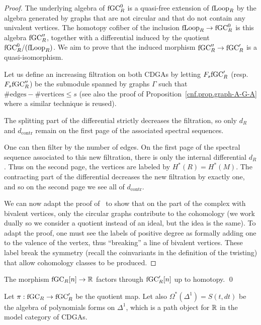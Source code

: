 \begin{proof}
  The underlying algebra of $\mathrm{fGC}^{0}_{R}$ is a quasi-free extension of $\mathrm{fLoop}_{R}$ by the algebra generated by graphs that are not circular and that do not contain any univalent vertices.
  The homotopy cofiber of the inclusion $\mathrm{fLoop}_{R} \to \mathrm{fGC}^{0}_{R}$ is this algebra $\mathrm{fGC}''_{R}$, together with a differential induced by the quotient $\mathrm{fGC}^{0}_{R} / (\mathrm{fLoop}_{R})$.
  We aim to prove that the induced morphism $\mathrm{fGC}''_{R} \to \mathrm{fGC}'_{R}$ is a quasi-iso\-mor\-phism.

  Let us define an increasing filtration on both CDGAs by letting $F_{s}\mathrm{fGC}'_{R}$ (resp.\ $F_{s}\mathrm{fGC}''_{R}$) be the submodule spanned by graphs $\Gamma$ such that $\# \text{edges} - \# \text{vertices} \leq s$ (see also the proof of Proposition~\ref{cnf.prop.graph-A-G-A} where a similar technique is reused).

  The splitting part of the differential strictly decreases the filtration, so only $d_{R}$ and $d_{\mathrm{contr}}$ remain on the first page of the associated spectral sequences.

  One can then filter by the number of edges.
  On the first page of the spectral sequence associated to this new filtration, there is only the internal differential $d_{R}$.
  Thus on the second page, the vertices are labeled by $H^{*}(R) = H^{*}(M)$. The contracting part of the differential decreases the new filtration by exactly one, and so on the second page we see all of $d_{\mathrm{contr}}$.

  We can now adapt the proof of~\cite[Proposition 3.4]{Willwacher2014} to show that on the part of the complex with bivalent vertices, only the circular graphs contribute to the cohomology (we work dually so we consider a quotient instead of an ideal, but the idea is the same).
  To adapt the proof, one must see the labels of positive degree as formally adding one to the valence of the vertex, thus ``breaking'' a line of bivalent vertices.
  These label break the symmetry (recall the coinvariants in the definition of the twisting) that allow cohomology classes to be produced.
\end{proof}

\begin{corollary}
  The morphism $\mathrm{fGC}_{R}[n] \to \mathbb{R}$ factors through $\mathrm{fGC}'_{R}[n]$ up to homotopy.
  \qed
\end{corollary}

Let $\pi : \mathrm{fGC}_{R} \to \mathrm{fGC}'_{R}$ be the quotient map.
Let also $\Omega^{*}(\Delta^{1}) = S(t, dt)$ be the algebra of polynomials forms on $\Delta^{1}$, which is a path object for $\mathbb{R}$ in the model category of CDGAs.

